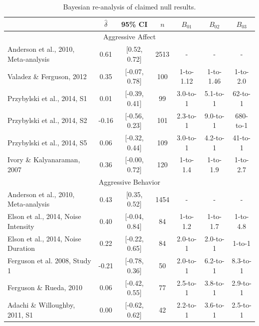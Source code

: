 \documentclass[man]{apa6}
\begin{document}
\begin{table}
\caption{Bayesian re-analysis of claimed null results.}
\begin{tabular}{lcccccc}
&$\hat{\delta}$   &95\% CI&$n$  &$B_{01}$ & $B_{02}$ &$B_{03}$ \\ \hline
\multicolumn{7}{c}{Aggressive Affect}\\
Anderson et al., 2010, Meta-analysis&0.61&[0.52, 0.72]&2513&-&-&- \\
\hspace{.2in} Valadez \& Ferguson, 2012&0.35&[-0.07, 0.78]&100&1-to-1.12&1-to-1.46&1-to-2.0 \\ %
\hspace{.2in} Przybylski et al., 2014, S1&0.01&[-0.39, 0.41]&99&3.0-to-1&5.1-to-1&62-to-1 \\
\hspace{.2in} Przybylski et al., 2014, S2&-0.16&[-0.56, 0.23]&101&2.3-to-1&9.0-to-1&680-to-1 \\ %
\hspace{.2in} Przybylski et al., 2014, S5&0.06&[-0.32, 0.44]&109&3.0-to-1&4.2-to-1&41-to-1 \\
\hspace{.2in} Ivory \& Kalyanaraman, 2007&0.36&[-0.00, 0.72]&120&1-to-1.4&1-to-1.9&1-to-2.7 \\
\multicolumn{7}{c}{Aggressive Behavior}\\
Anderson et al., 2010, Meta-analysis&0.43&[0.35, 0.52]&1454&-&-&- \\
\hspace{.2in} Elson et al., 2014, Noise Intensity&0.40&[-0.04, 0.84]&84&1-to-1.2&1-to-1.7&1-to-4.8 \\
\hspace{.2in} Elson et al., 2014, Noise Duration&0.22&[-0.22, 0.65]&84&2.0-to-1&2.0-to-1&1-to-1 \\
\hspace{.2in} Ferguson et al. 2008, Study 1 &-0.21&[-0.78, 0.36]&50&2.0-to-1&6.2-to-1&8.3-to-1 \\ %
\hspace{.2in} Ferguson \& Rueda, 2010 &0.06&[-0.42, 0.55]&77&2.5-to-1&3.8-to-1&2.9-to-1 \\
\hspace{.2in} Adachi \& Willoughby, 2011, S1&0.00&[-0.62, 0.62]&42&2.2-to-1&3.6-to-1&2.5-to-1 \\

\end{tabular}
\end{table}
\end{document}
